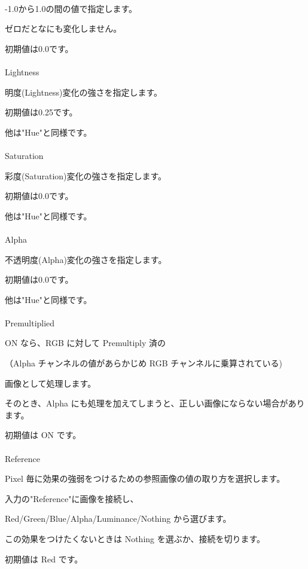 \documentclass[a4paper,12pt]{article}
\begin{document}
\newpage

\thispagestyle{empty}

\ \vspace{-0.2em}
\par
-1.0から1.0の間の値で指定します。\par
ゼロだとなにも変化しません。\par
初期値は0.0です。\\
\\
Lightness\par
明度(Lightness)変化の強さを指定します。\par
初期値は0.25です。\par
他は"Hue"と同様です。\\
\\
Saturation\par
彩度(Saturation)変化の強さを指定します。\par
初期値は0.0です。\par
他は"Hue"と同様です。\\
\\
Alpha\par
不透明度(Alpha)変化の強さを指定します。\par
初期値は0.0です。\par
他は"Hue"と同様です。\\
\\
Premultiplied\par
ON なら、RGB に対して Premultiply 済の\par
（Alpha チャンネルの値があらかじめ RGB チャンネルに乗算されている)\par
画像として処理します。\par
そのとき、Alpha にも処理を加えてしまうと、正しい画像にならない場合があります。\par
初期値は ON です。\\
\\
Reference\par
Pixel 毎に効果の強弱をつけるための参照画像の値の取り方を選択します。\par
入力の"Reference"に画像を接続し、\par
Red/Green/Blue/Alpha/Luminance/Nothing から選びます。\par
この効果をつけたくないときは Nothing を選ぶか、接続を切ります。\par
初期値は Red です。
\end{document}
